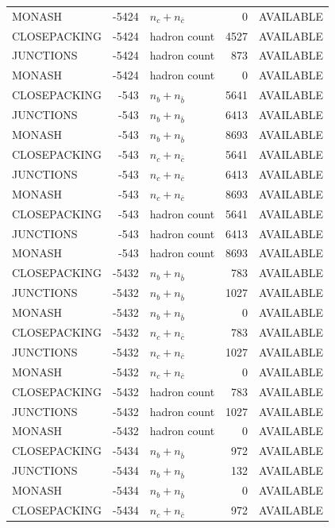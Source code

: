 \begin{landscape}
\begin{longtable}{@{}lrlrl@{}}
MONASH & -5424 & $n_c+n_{\bar c}$ & \num{0} & AVAILABLE \\
CLOSEPACKING & -5424 & hadron count & \num{4527} & AVAILABLE \\
JUNCTIONS & -5424 & hadron count & \num{873} & AVAILABLE \\
MONASH & -5424 & hadron count & \num{0} & AVAILABLE \\
CLOSEPACKING & -543 & $n_b+n_{\bar b}$ & \num{5641} & AVAILABLE \\
JUNCTIONS & -543 & $n_b+n_{\bar b}$ & \num{6413} & AVAILABLE \\
MONASH & -543 & $n_b+n_{\bar b}$ & \num{8693} & AVAILABLE \\
CLOSEPACKING & -543 & $n_c+n_{\bar c}$ & \num{5641} & AVAILABLE \\
JUNCTIONS & -543 & $n_c+n_{\bar c}$ & \num{6413} & AVAILABLE \\
MONASH & -543 & $n_c+n_{\bar c}$ & \num{8693} & AVAILABLE \\
CLOSEPACKING & -543 & hadron count & \num{5641} & AVAILABLE \\
JUNCTIONS & -543 & hadron count & \num{6413} & AVAILABLE \\
MONASH & -543 & hadron count & \num{8693} & AVAILABLE \\
CLOSEPACKING & -5432 & $n_b+n_{\bar b}$ & \num{783} & AVAILABLE \\
JUNCTIONS & -5432 & $n_b+n_{\bar b}$ & \num{1027} & AVAILABLE \\
MONASH & -5432 & $n_b+n_{\bar b}$ & \num{0} & AVAILABLE \\
CLOSEPACKING & -5432 & $n_c+n_{\bar c}$ & \num{783} & AVAILABLE \\
JUNCTIONS & -5432 & $n_c+n_{\bar c}$ & \num{1027} & AVAILABLE \\
MONASH & -5432 & $n_c+n_{\bar c}$ & \num{0} & AVAILABLE \\
CLOSEPACKING & -5432 & hadron count & \num{783} & AVAILABLE \\
JUNCTIONS & -5432 & hadron count & \num{1027} & AVAILABLE \\
MONASH & -5432 & hadron count & \num{0} & AVAILABLE \\
CLOSEPACKING & -5434 & $n_b+n_{\bar b}$ & \num{972} & AVAILABLE \\
JUNCTIONS & -5434 & $n_b+n_{\bar b}$ & \num{132} & AVAILABLE \\
MONASH & -5434 & $n_b+n_{\bar b}$ & \num{0} & AVAILABLE \\
CLOSEPACKING & -5434 & $n_c+n_{\bar c}$ & \num{972} & AVAILABLE \\

\end{longtable}
\end{landscape}
